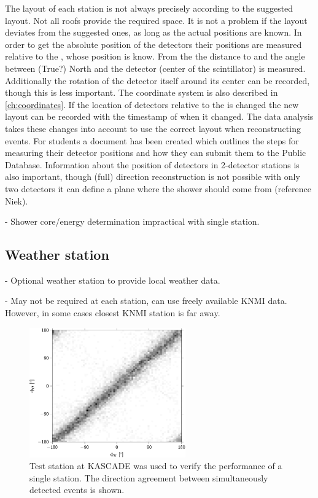 The layout of each station is not always precisely according to the suggested layout. Not all roofs provide the required space. It is not a problem if the layout deviates from the suggested ones, as long as the actual positions are known. In order to get the absolute position of the detectors their positions are measured relative to the \gps, whose position is know. From the \gps the distance to and the angle between (True?) North and the detector (center of the scintillator) is measured. Additionally the rotation of the detector itself around its center can be recorded, though this is less important. The coordinate system is also described in \cref{ch:coordinates}. If the location of detectors relative to the \gps is changed the new layout can be recorded with the timestamp of when it changed. The data analysis takes these changes into account to use the correct layout when reconstructing events. For students a document has been created which outlines the steps for measuring their detector positions and how they can submit them to the Public Database. Information about the position of detectors in 2-detector stations is also important, though (full) direction reconstruction is not possible with only two detectors it can define a plane where the shower should come from (reference Niek).


- Shower core/energy determination impractical with single station.


\subsection{Weather station}


- Optional weather station to provide local weather data.

- May not be required at each station, can use freely available KNMI data. However, in some cases closest KNMI station is far away.



\begin{figure}
    \centering
    \includegraphics[width=0.6\textwidth]
                    {plots/experiment/azimuth_kascade_minn1}
    \caption{Test station at KASCADE was used to verify the performance of a single station. The direction agreement between simultaneously detected events is shown.}
    \label{fig:azimuth_kascade_minn1}
\end{figure}

